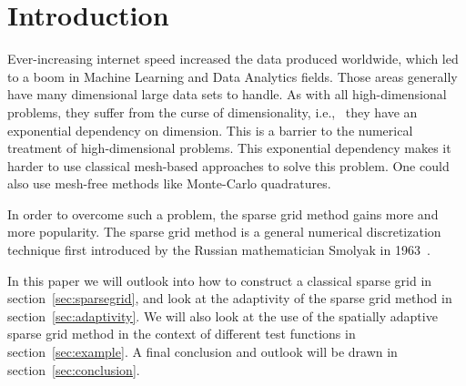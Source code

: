 \section{Introduction}

Ever-increasing internet speed increased the data produced worldwide, which led to a boom in Machine Learning and Data Analytics fields.
Those areas generally have many dimensional large data sets to handle. As with all high-dimensional problems, they suffer from the curse of dimensionality, i.e., \ they have an
exponential dependency on dimension. This is a barrier to the numerical treatment of high-dimensional problems.
This exponential dependency makes it harder to use classical mesh-based approaches to solve this problem. One could also use mesh-free methods like Monte-Carlo quadratures.

In order to overcome such a problem, the sparse grid method gains more and more popularity.
The sparse grid method is a general numerical discretization technique first introduced by the Russian mathematician Smolyak in 1963~\cite{smolyak1963quadrature}.

In this paper we will outlook into how to construct a classical sparse grid in section~\ref{sec:sparsegrid}, and look at the adaptivity of the sparse grid method in section~\ref{sec:adaptivity}.
We will also look at the use of the spatially adaptive sparse grid method in the context of different test functions in section~\ref{sec:example}.
A final conclusion and outlook will be drawn in section~\ref{sec:conclusion}.